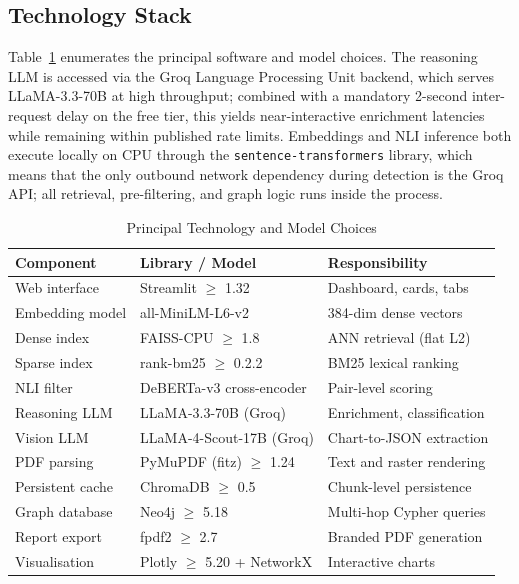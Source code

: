 \documentclass[conference]{IEEEtran}
\begin{document}
\subsection{Technology Stack}
Table~\ref{tab:stack} enumerates the principal software and model choices. The reasoning LLM is accessed via the Groq Language Processing Unit backend, which serves LLaMA-3.3-70B at high throughput; combined with a mandatory 2-second inter-request delay on the free tier, this yields near-interactive enrichment latencies while remaining within published rate limits. Embeddings and NLI inference both execute locally on CPU through the \texttt{sentence-transformers} library, which means that the only outbound network dependency during detection is the Groq API; all retrieval, pre-filtering, and graph logic runs inside the process.
\begin{table}[htbp]
\caption{Principal Technology and Model Choices}
\label{tab:stack}
\begin{center}
\begin{tabular}{|l|l|l|}
\hline
\textbf{Component} & \textbf{Library / Model} & \textbf{Responsibility} \\
\hline
Web interface & Streamlit $\geq$ 1.32 & Dashboard, cards, tabs \\
Embedding model & all-MiniLM-L6-v2 & 384-dim dense vectors \\
Dense index & FAISS-CPU $\geq$ 1.8 & ANN retrieval (flat L2) \\
Sparse index & rank-bm25 $\geq$ 0.2.2 & BM25 lexical ranking \\
NLI filter & DeBERTa-v3 cross-encoder & Pair-level scoring \\
Reasoning LLM & LLaMA-3.3-70B (Groq) & Enrichment, classification \\
Vision LLM & LLaMA-4-Scout-17B (Groq) & Chart-to-JSON extraction \\
PDF parsing & PyMuPDF (fitz) $\geq$ 1.24 & Text and raster rendering \\
Persistent cache & ChromaDB $\geq$ 0.5 & Chunk-level persistence \\
Graph database & Neo4j $\geq$ 5.18 & Multi-hop Cypher queries \\
Report export & fpdf2 $\geq$ 2.7 & Branded PDF generation \\
Visualisation & Plotly $\geq$ 5.20 + NetworkX & Interactive charts \\
\hline
\end{tabular}
\end{center}
\end{table}
\end{document}
